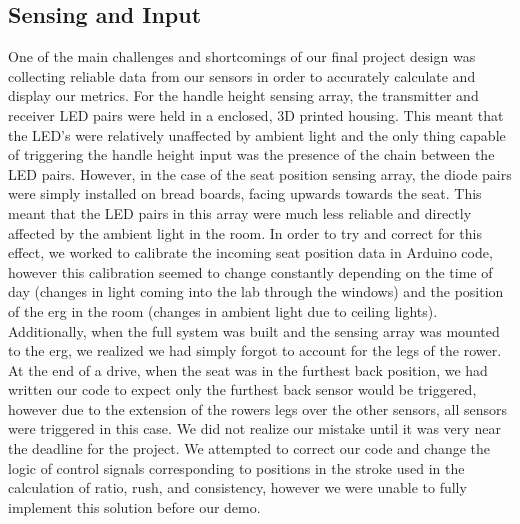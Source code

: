 \documentclass[letterpaper]{article} %
\begin{document}
\subsection{Sensing and Input}
One of the main challenges and shortcomings of our final project design was collecting reliable data from our sensors in order to accurately calculate and display our metrics. For the handle height sensing array, the transmitter and receiver LED pairs were held in a enclosed, 3D printed housing. This meant that the LED's were relatively unaffected by ambient light and the only thing capable of triggering the handle height input was the presence of the chain between the LED pairs. However, in the case of the seat position sensing array, the diode pairs were simply installed on bread boards, facing upwards towards the seat. This meant that the LED pairs in this array were much less reliable and directly affected by the ambient light in the room.
In order to try and correct for this effect, we worked to calibrate the incoming seat position data in Arduino code, however this calibration seemed to change constantly depending on the time of day (changes in light coming into the lab through the windows) and the position of the erg in the room (changes in ambient light due to ceiling lights). Additionally, when the full system was built and the sensing array was mounted to the erg, we realized we had simply forgot to account for the legs of the rower. At the end of a drive, when the seat was in the furthest back position, we had written our code to expect only the furthest back sensor would be triggered, however due to the extension of the rowers legs over the other sensors, all sensors were triggered in this case. We did not realize our mistake until it was very near the deadline for the project. We attempted to correct our code and change the logic of control signals corresponding to positions in the stroke used in the calculation of ratio, rush, and consistency, however we were unable to fully implement this solution before our demo.
\end{document}
